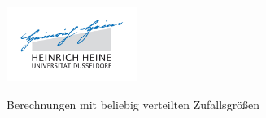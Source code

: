 \documentclass[11pt]{beamer}
\begin{document}
\begin{frame}
  \begin{center}
    \includegraphics[width=120pt]{thesis/logo}\\

    \vspace{2em}

    {\LARGE Berechnungen mit beliebig verteilten Zufallsgrößen}\\
  \end{center}
\end{frame}
\end{document}
